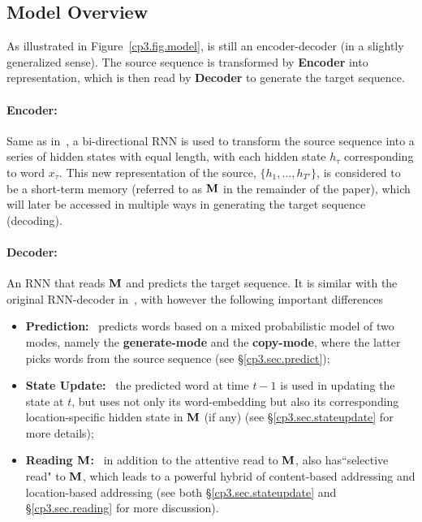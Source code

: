   
\subsection{Model Overview}
As illustrated in Figure~\ref{cp3.fig.model}, \copynet is still an encoder-decoder (in a slightly generalized sense). The source sequence is transformed by \textbf{Encoder} into 
representation, which is then read by \textbf{Decoder} to generate the target sequence.

\paragraph{Encoder:} Same as in~\cite{bahdanau2014neural}, a bi-directional RNN is used to transform the source sequence into a series of hidden states with equal length, with each hidden state $h_\tau$ corresponding to word $x_\tau$. 
This new representation of the source, $\{h_1, ..., h_{T'}\}$, is considered to be a short-term memory  (referred to as $\mathbf{M}$ in the remainder of the paper), which will later be accessed in multiple ways in generating the target sequence (decoding).

\paragraph{Decoder:}  An RNN that reads $\mathbf{M}$ 
and predicts the target sequence. It is similar with the original RNN-decoder in~\cite{bahdanau2014neural}, with however the following important differences 
\begin{itemize}
    \item {\bf Prediction:}~ \copynet predicts words based on a mixed probabilistic model of two modes, namely the \textbf{generate-mode} and the \textbf{copy-mode}, where the latter picks words from the source sequence (see \S\ref{cp3.sec.predict});
	\item {\bf  State Update:}~ the predicted word at time $t-1$ is used in updating the state at $t$, but \copynet uses not only its word-embedding but also its corresponding location-specific hidden state in $\mathbf{M}$ (if any) (see \S\ref{cp3.sec.stateupdate} for more details);
	\item {\bf Reading $\mathbf{M}$:}~ in addition to the attentive read to $\mathbf{M}$, \copynet also has``selective read" to $\mathbf{M}$, which leads to a powerful hybrid of content-based addressing and location-based addressing (see both \S\ref{cp3.sec.stateupdate} and \S\ref{cp3.sec.reading} for more discussion).
\end{itemize}

